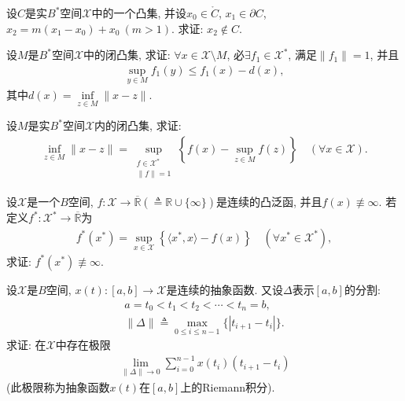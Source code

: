 \documentclass[../../main.tex]{subfiles}%
\begin{document}
\begin{example}
设$C$是实$B^*$空间$\mathscr{X}$中的一个凸集, 并设$x_0 \in \mathring{C}$, $x_1 \in \partial C$, $x_2 = m(x_1 - x_0) + x_0 \ (m > 1)$. 求证: $x_2 \notin C$.
\end{example}

\begin{example}
设$M$是$B^*$空间$\mathscr{X}$中的闭凸集, 求证: $\forall x \in \mathscr{X} \setminus M$, 必$\exists f_1 \in \mathscr{X}^*$, 满足$\|f_1\| = 1$, 并且
\begin{align*}
\sup\limits_{y \in M} f_1(y) \leqslant f_1(x) - d(x),
\end{align*}
其中$d(x) = \inf\limits_{z \in M} \|x - z\|$.
\end{example}

\begin{example}
设$M$是实$B^*$空间$\mathscr{X}$内的闭凸集, 求证:
\begin{align*}
\inf\limits_{z \in M} \|x - z\| = \sup\limits_{\substack{f \in \mathscr{X}^* \\ \|f\| = 1}} \left\{ f(x) - \sup\limits_{z \in M} f(z) \right\} \quad (\forall x \in \mathscr{X}).
\end{align*}
\end{example}

\begin{example}
设$\mathscr{X}$是一个$B$空间, $f: \mathscr{X} \to \overline{\mathbb{R}} (\triangleq \mathbb{R} \cup \{\infty\})$是连续的凸泛函, 并且$f(x) \not\equiv \infty$. 若定义$f^*: \mathscr{X}^* \to \overline{\mathbb{R}}$为
\begin{align*}
f^*(x^*) = \sup\limits_{x \in \mathscr{X}} \left\{ \langle x^*, x \rangle - f(x) \right\} \quad (\forall x^* \in \mathscr{X}^*),
\end{align*}
求证: $f^*(x^*) \not\equiv \infty$.
\end{example}

\begin{example}
设$\mathscr{X}$是$B$空间, $x(t): [a,b] \to \mathscr{X}$是连续的抽象函数. 又设$\Delta$表示$[a,b]$的分割:
\begin{align*}
a = t_0 < t_1 < t_2 < \cdots < t_n = b, \\
\|\Delta\| \triangleq \max\limits_{0 \leqslant i \leqslant n-1} \{|t_{i+1} - t_i|\}.
\end{align*}
求证: 在$\mathscr{X}$中存在极限
\begin{align*}
\lim\limits_{\|\Delta\| \to 0} \sum\limits_{i=0}^{n-1} x(t_i)(t_{i+1} - t_i)
\end{align*}
(此极限称为抽象函数$x(t)$在$[a,b]$上的Riemann积分).
\end{example}
\end{document}
